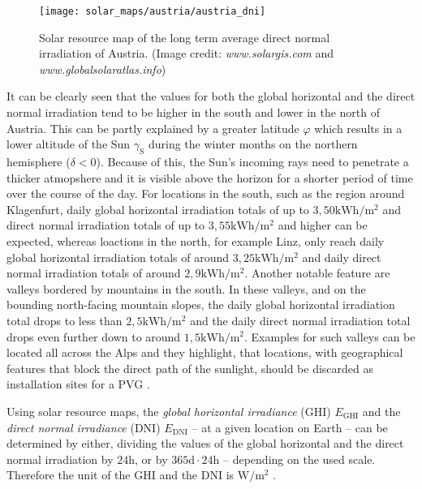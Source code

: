 \begin{figure}[h!]
	\centering
  	\texttt{[image: solar\_maps/austria/austria\_dni]}
	\caption{Solar resource map of the long term average direct normal irradiation of Austria. (Image credit: \emph{www.solargis.com} and \emph{www.globalsolaratlas.info})}
	\label{fig:dni_austria}
\end{figure}

It can be clearly seen that the values for both the global horizontal and the direct normal irradiation tend to be higher in the south and lower in the north of Austria. This can be partly explained by a greater latitude $\varphi$ which results in a lower altitude of the Sun $\gamma_{\mathrm{S}}$ during the winter months on the northern hemisphere ($\delta < 0$). Because of this, the Sun's incoming rays need to penetrate a thicker atmopshere and it is visible above the horizon for a shorter period of time over the course of the day. For locations in the south, such as the region around Klagenfurt, daily global horizontal irradiation totals of up to $3,50\mathrm{kWh}/\mathrm{m}^2$ and direct normal irradiation totals of up to $3,55\mathrm{kWh}/\mathrm{m}^2$ and higher can be expected, whereas loactions in the north, for example Linz, only reach daily global horizontal irradiation totals of around $3,25\mathrm{kWh}/\mathrm{m}^2$ and daily direct normal irradiation totals of around $2,9\mathrm{kWh}/\mathrm{m}^2$. Another notable feature are valleys bordered by mountains in the south. In these valleys, and on the bounding north-facing mountain slopes, the daily global horizontal irradiation total drops to less than $2,5\mathrm{kWh}/\mathrm{m}^2$ and the daily direct normal irradiation total drops even further down to around $1,5\mathrm{kWh}/\mathrm{m}^2$. Examples for such valleys can be located all across the Alps and they highlight, that locations, with geographical features that block the direct path of the sunlight, should be discarded as installation sites for a PVG \cite{Karttunen:2006, Mertens:2015, Wagner:2018}.

Using solar resource maps, the \emph{global horizontal irradiance} (GHI) $E_{\mathrm{GHI}}$ and the \emph{direct normal irradiance} (DNI) $E_{\mathrm{DNI}}$ -- at a given location on Earth -- can be determined by either, dividing the values of the global horizontal and the direct normal irradiation by $24\mathrm{h}$, or by $365\mathrm{d} \cdot 24\mathrm{h}$ -- depending on the used scale. Therefore the unit of the GHI and the DNI is $\mathrm{W}/\mathrm{m}^2$ \cite{Mertens:2015, SolargisData:2020}.

